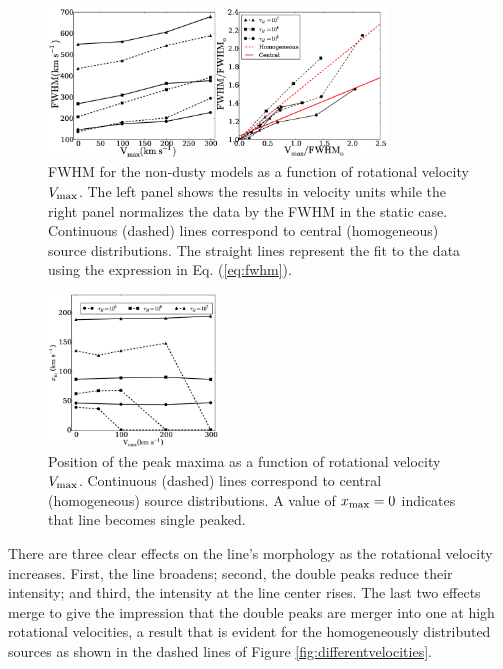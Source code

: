 \documentclass{emulateapj}
\begin{document}
\begin{figure}
\begin{center}
  \includegraphics[width=0.8\textwidth]{f2.eps}
\end{center}
  \caption{FWHM for the non-dusty models as a function of
    rotational velocity $V_{\rm max}$. The left panel shows the
    results in velocity units while the right panel normalizes
    the data by the FWHM in the static case. 
    Continuous (dashed) lines  correspond to central (homogeneous)
    source distributions. The straight lines represent the fit to
    the data using the expression in Eq. (\ref{eq:fwhm}).
    \label{fig:widthvsvelocity}} 
\end{figure}


\begin{figure}
\begin{center}
  \includegraphics[width=0.40\textwidth]{f3.eps}
\end{center}
\caption{Position of the peak maxima as a function of rotational
  velocity $V_{\rm max}$. Continuous (dashed) lines correspond to
  central (homogeneous) source distributions. A value of $x_{\rm
    max}=0$ indicates that line becomes single
  peaked. \label{fig:maximumsvsvelocity}}  
\end{figure}

There are three clear effects on the line's morphology as the
rotational velocity increases. First, the line
broadens; second, the double peaks reduce their intensity; and third,
the intensity at the line center rises. The last two effects merge to give the
impression that the double peaks are merger into one at high rotational
velocities, a result that is evident for the homogeneously distributed
sources as shown in the dashed lines of Figure \ref{fig:differentvelocities}.
\end{document}
